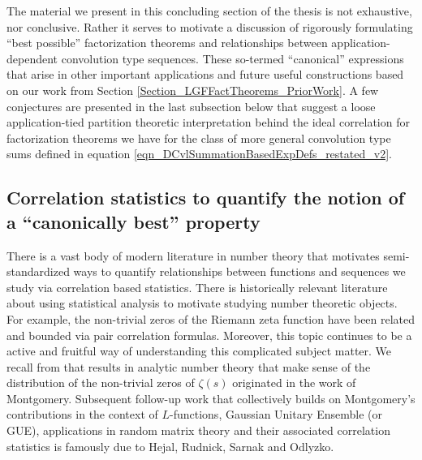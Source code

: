 \documentclass[12pt,reqno,a4letter]{article}
\numberwithin{figure}{section}
\numberwithin{table}{section}
\numberwithin{equation}{section}
\theoremstyle{plain}
\numberwithin{theorem}{section}
\theoremstyle{definition}
\begin{document}
The material we present in this concluding section of the thesis is not exhaustive, nor conclusive. 
Rather it serves to motivate a discussion of rigorously formulating ``best possible'' factorization theorems 
and relationships between application-dependent convolution type 
sequences. These so-termed ``canonical'' 
expressions that arise in other important applications and future useful constructions based on our work 
from Section \ref{Section_LGFFactTheorems_PriorWork}. 
A few conjectures are presented in the last subsection below that suggest a loose 
application-tied partition theoretic interpretation behind the ideal correlation for factorization 
theorems we have for the class of more general convolution type sums defined in 
equation \eqref{eqn_DCvlSummationBasedExpDefs_restated_v2}. 

\subsection{Correlation statistics to quantify the notion of a ``canonically best'' property}

There is a vast body of modern literature in number theory that motivates semi-standardized ways to quantify 
relationships between functions and sequences we study via correlation based statistics. 
There is historically relevant literature about using statistical analysis to motivate 
studying number theoretic objects. For example, the non-trivial zeros of the Riemann zeta function 
have been related and bounded via pair correlation formulas. Moreover, this 
topic continues to be a active and fruitful way of understanding this complicated subject matter. 
We recall from \cite{WILLIAMS-MILLER-PCORR-OVERVIEW-REF} that results in analytic number theory that 
make sense of the distribution of the non-trivial zeros of $\zeta(s)$ originated in the work of Montgomery. 
Subsequent follow-up work that collectively builds on Montgomery's contributions in the context of 
$L$-functions, Gaussian Unitary Ensemble (or GUE), 
applications in random matrix theory and their associated correlation statistics is famously due to 
Hejal, Rudnick, Sarnak and Odlyzko. 
\end{document}
